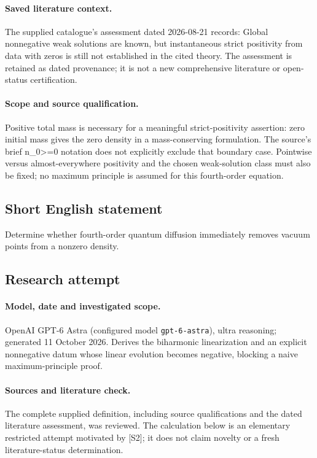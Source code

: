 \documentclass[11pt]{article}
\begin{document}
\paragraph{Saved literature context.} The supplied catalogue's assessment dated 2026-08-21 records: Global nonnegative weak solutions are known, but instantaneous strict positivity from data with zeros is still not established in the cited theory. The assessment is retained as dated provenance; it is not a new comprehensive literature or open-status certification.
\paragraph{Scope and source qualification.}Positive total mass is necessary for a meaningful strict-positivity assertion: zero initial mass gives the zero density in a mass-conserving formulation. The source's brief n_0>=0 notation does not explicitly exclude that boundary case. Pointwise versus almost-everywhere positivity and the chosen weak-solution class must also be fixed; no maximum principle is assumed for this fourth-order equation.
\subsection{Short English statement}
Determine whether fourth-order quantum diffusion immediately removes vacuum points from a nonzero density.
\subsection{Research attempt}
\paragraph{Model, date and investigated scope.}
OpenAI GPT-6 Astra (configured model \texttt{gpt-6-astra}), ultra reasoning; generated 11 October 2026. Derives the biharmonic linearization and an explicit nonnegative datum whose linear evolution becomes negative, blocking a naive maximum-principle proof.

\paragraph{Sources and literature check.}
The complete supplied definition, including source qualifications and the dated literature assessment, was reviewed. The calculation below is an elementary restricted attempt motivated by [S2]; it does not claim novelty or a fresh literature-status determination.
\end{document}
